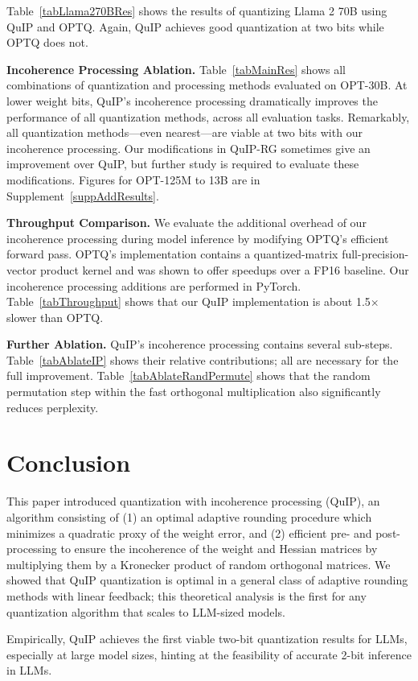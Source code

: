 Table~\ref{tabLlama270BRes} shows the results of quantizing Llama 2 70B using QuIP and OPTQ. Again, QuIP achieves good quantization at two bits while OPTQ does not. 

\textbf{Incoherence Processing Ablation.}
Table~\ref{tabMainRes} shows all combinations of quantization and processing methods evaluated on OPT-30B. At lower weight bits, QuIP's incoherence processing dramatically improves the performance of all quantization methods, across all evaluation tasks. Remarkably, all quantization methods---even nearest---are viable at two bits with our incoherence processing. Our modifications in QuIP-RG sometimes give an improvement over QuIP, but further study is required to evaluate these modifications. Figures for OPT-125M to 13B are in Supplement~\ref{suppAddResults}.

\textbf{Throughput Comparison.} We evaluate the additional overhead of our incoherence processing during model inference by modifying OPTQ's efficient forward pass. OPTQ's implementation contains a quantized-matrix full-precision-vector product kernel and was shown to offer speedups over a FP16 baseline. Our incoherence processing additions are performed in PyTorch.
Table~\ref{tabThroughput} shows that our QuIP implementation is about 1.5$\times$ slower than OPTQ.

\textbf{Further Ablation.} QuIP's incoherence processing contains several sub-steps.
Table~\ref{tabAblateIP} shows their relative contributions; all are necessary for the full improvement.
Table~\ref{tabAblateRandPermute} shows that the random permutation step within the fast orthogonal multiplication also significantly reduces perplexity.

\section{Conclusion}
This paper introduced quantization with incoherence processing (QuIP), an algorithm consisting of (1) an optimal adaptive rounding procedure which minimizes a quadratic proxy of the weight error, and (2) efficient pre- and post-processing to ensure the incoherence of the weight and Hessian matrices by multiplying them by a Kronecker product of random orthogonal matrices. We showed that QuIP quantization is optimal in a general class of adaptive rounding methods with linear feedback; this theoretical analysis is the first for any quantization algorithm that scales to LLM-sized models. 

Empirically, QuIP achieves the first viable two-bit quantization results for LLMs, especially at large model sizes, hinting at the feasibility of accurate 2-bit inference in LLMs.


